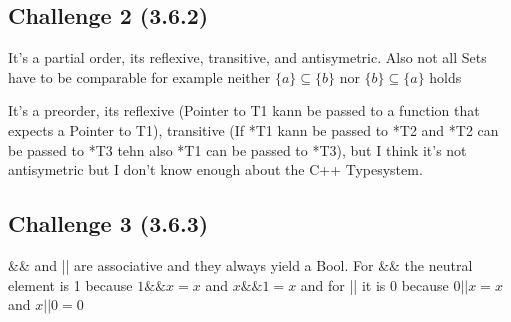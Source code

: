 \documentclass[11pt]{article}
\begin{document}
    \subsection*{Challenge 2 (3.6.2)}

        It's a partial order, its reflexive, transitive, and antisymetric. Also not all Sets have to be comparable for example neither $\{a\} \subseteq \{b\}$ nor $\{b\} \subseteq \{a\}$ holds

        It's a preorder, its reflexive (Pointer to T1 kann be passed to a function that expects a Pointer to T1), transitive (If *T1 kann be passed to *T2 and *T2 can be passed to *T3 tehn also *T1 can be passed to *T3), but I think it's not antisymetric but I don't know enough about the C++ Typesystem. 

    \subsection*{Challenge 3 (3.6.3)}
        \&\& and || are associative and they always yield a Bool. For \&\& the neutral element is 1 because $1 \&\& x = x$ and $x \&\& 1 = x$ and for || it is 0 because $0 || x = x$ and $x || 0 = 0$
\end{document}
